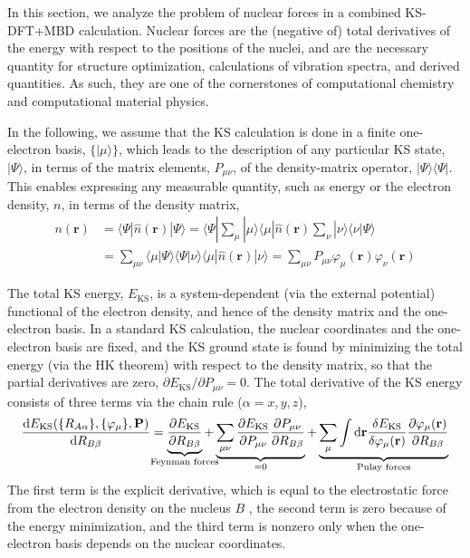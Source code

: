 In this section, we analyze the problem of nuclear forces in a combined KS-DFT+MBD calculation.
Nuclear forces are the (negative of) total derivatives of the energy with respect to the positions of the nuclei, and are the necessary quantity for structure optimization, calculations of vibration spectra, and derived quantities.
As such, they are one of the cornerstones of computational chemistry and computational material physics.

In the following, we assume that the KS calculation is done in a finite one-electron basis, $\{|\mu\rangle\}$, which leads to the description of any particular KS state, $|\Psi\rangle$, in terms of the matrix elements, $P_{\mu\nu}$, of the density-matrix operator, $|\Psi\rangle\langle\Psi|$.
This enables expressing any measurable quantity, such as energy or the electron density, $n$, in terms of the density matrix,
\begin{equation}
\begin{aligned}
	n(\mathbf r)&=\langle\Psi|\hat n(\mathbf r)|\Psi\rangle=\langle\Psi|\sum_\mu|\mu\rangle\langle\mu|\hat n(\mathbf r)\sum_\nu|\nu\rangle\langle\nu|\Psi\rangle \\
	&=\sum_{\mu\nu}\langle\mu|\Psi\rangle\langle\Psi|\nu\rangle\langle\mu|\hat n(\mathbf r)|\nu\rangle
	=\sum_{\mu\nu}P_{\mu\nu}\varphi_\mu(\mathbf r)\varphi_\nu(\mathbf r)
\end{aligned}
\end{equation}

The total KS energy, $E_\text{KS}$, is a system-dependent (via the external potential) functional of the electron density, and hence of the density matrix and the one-electron basis.
In a standard KS calculation, the nuclear coordinates and the one-electron basis are fixed, and the KS ground state is found by minimizing the total energy (via the HK theorem) with respect to the density matrix, so that the partial derivatives are zero, $\partial E_\text{KS}/\partial P_{\mu\nu}=0$.
The total derivative of the KS energy consists of three terms via the chain rule ($\alpha=x,y,z$),
\begin{equation}
\frac{\mathrm dE_\text{KS}(\{R_{A\alpha}\},\{\varphi_\mu\},\mathbf P)}{\mathrm d R_{B\beta}}=\underbrace{\frac{\partial E_\text{KS}}{\partial R_{B\beta}}}_{\mathclap{\text{Feynman forces}}}+\underbrace{\sum_{\mu\nu}\frac{\partial E_\text{KS}}{\partial P_{\mu\nu}}\frac{\partial P_{\mu\nu}}{\partial R_{B\beta}}}_{=0}+\underbrace{\sum_\mu\int\mathrm d\mathbf r\frac{\delta E_\text{KS}}{\delta\varphi_\mu(\mathbf r)}\frac{\partial\varphi_\mu(\mathbf r)}{\partial R_{B\beta}}}_\text{Pulay forces}
\end{equation}
The first term is the explicit derivative, which is equal to the electrostatic force from the electron density on the nucleus $B$ \citep{FeynmanPR39}, the second term is zero because of the energy minimization, and the third term is nonzero only when the one-electron basis depends on the nuclear coordinates.


